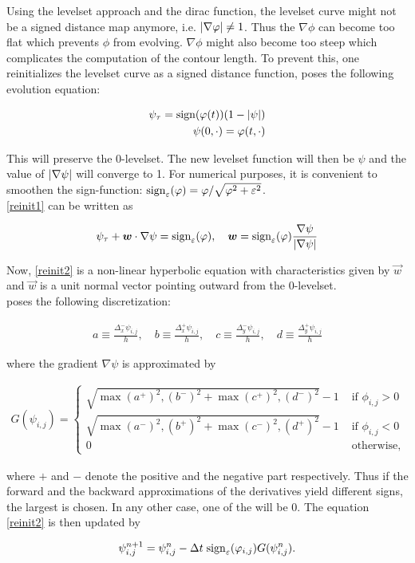 Using the levelset approach and the dirac function, the levelset curve might not be a signed distance map anymore, i.e. $\left| {\nabla \varphi} \right|\neq 1$. Thus the $\nabla\phi$ can become too flat which prevents $\phi$ from evolving. $\nabla\phi$ might also become too steep which complicates the computation of the contour length. To prevent this, one reinitializes the levelset curve as a signed distance function, \cite{suss.94} poses the following evolution equation:

\begin{align}
\psi_\tau = \sign(\phi(t))(1-\abs{\psi})\label{reinit1}\\
\psi(0,\cdot) = \phi(t,\cdot)
\end{align}

This will preserve the 0-levelset. The new levelset function will then be $\psi$ and the value of $\left| {\nabla \psi} \right|$ will converge to 1.
For numerical purposes, it is convenient to smoothen the sign-function: ${\rm sign}_\varepsilon(\varphi) = \varphi/\sqrt{\varphi^2+\varepsilon^2}$.\\
\eqref{reinit1} can be written as

\begin{equation}
\psi_\tau + \vec{w}\cdot\nabla\psi = \sign_\epsilon(\phi), \quad \vec{w} = \sign_\epsilon(\phi)\frac{\nabla\psi}{\abs{\nabla\psi}}\label{reinit2}
\end{equation}

Now, \eqref{reinit2} is a non-linear hyperbolic equation with characteristics given by $\vec{w}$ and $\vec{w}$ is a unit normal vector pointing outward from the 0-levelset.\\
\cite{suss.94} poses the following discretization:

\begin{align}
a \equiv \frac{\Delta_x^- \psi_{i,j}}{h},\quad b \equiv \frac{\Delta_x^+ \psi_{i,j}}{h},\quad c \equiv \frac{\Delta_y^- \psi_{i,j}}{h}, \quad d \equiv \frac{\Delta_y^+ \psi_{i,j}}{h} 
\end{align}

where the gradient $\nabla \psi$ is approximated by 

\begin{align}
  G(\psi_{i,j}) = \begin{cases}
    \sqrt{\max{(a^+)^2,(b^-)^2}+\max{(c^+)^2,(d^-)^2}}-1 & \mbox{ if } \phi_{i,j}>0\\
    \sqrt{\max{(a^-)^2,(b^+)^2}+\max{(c^-)^2,(d^+)^2}}-1 & \mbox{ if } \phi_{i,j}<0\\
    0 &\mbox{ otherwise,}
  \end{cases}
\end{align}

where $+$ and $-$ denote the positive and the negative part respectively. Thus if the forward and the backward approximations of the derivatives yield different signs, the largest is chosen. In any other case, one of the will be 0. The equation \eqref{reinit2} is then updated by 

\begin{equation}
\psi_{i,j}^{n+1}=\psi_{i,j}^n - \Delta t \;{\rm sign}_\varepsilon(\varphi_{i,j})G(\psi_{i,j}^n).
\end{equation}\vline